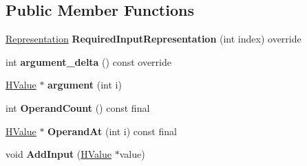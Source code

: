 \subsection*{Public Member Functions}
\begin{DoxyCompactItemize}
\item 
\hyperlink{classv8_1_1internal_1_1_representation}{Representation} {\bfseries Required\+Input\+Representation} (int index) override\hypertarget{classv8_1_1internal_1_1_h_push_arguments_aefe594affaa91486f3e2e1c5de419d51}{}\label{classv8_1_1internal_1_1_h_push_arguments_aefe594affaa91486f3e2e1c5de419d51}

\item 
int {\bfseries argument\+\_\+delta} () const  override\hypertarget{classv8_1_1internal_1_1_h_push_arguments_a1c66b462cdeff2966f39b7942d5924a6}{}\label{classv8_1_1internal_1_1_h_push_arguments_a1c66b462cdeff2966f39b7942d5924a6}

\item 
\hyperlink{classv8_1_1internal_1_1_h_value}{H\+Value} $\ast$ {\bfseries argument} (int i)\hypertarget{classv8_1_1internal_1_1_h_push_arguments_a809d6d736b4af60e2aeabf8248fac9aa}{}\label{classv8_1_1internal_1_1_h_push_arguments_a809d6d736b4af60e2aeabf8248fac9aa}

\item 
int {\bfseries Operand\+Count} () const  final\hypertarget{classv8_1_1internal_1_1_h_push_arguments_a07786ce21473f2da4643ffb882efbfeb}{}\label{classv8_1_1internal_1_1_h_push_arguments_a07786ce21473f2da4643ffb882efbfeb}

\item 
\hyperlink{classv8_1_1internal_1_1_h_value}{H\+Value} $\ast$ {\bfseries Operand\+At} (int i) const  final\hypertarget{classv8_1_1internal_1_1_h_push_arguments_a453448280c22a79c1caa94ab68d87bec}{}\label{classv8_1_1internal_1_1_h_push_arguments_a453448280c22a79c1caa94ab68d87bec}

\item 
void {\bfseries Add\+Input} (\hyperlink{classv8_1_1internal_1_1_h_value}{H\+Value} $\ast$value)\hypertarget{classv8_1_1internal_1_1_h_push_arguments_a620b92530a23b2b63f406bbd1e4a7ae3}{}\label{classv8_1_1internal_1_1_h_push_arguments_a620b92530a23b2b63f406bbd1e4a7ae3}

\end{DoxyCompactItemize}
